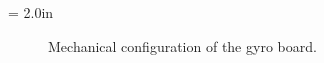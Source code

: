 

\epsfysize = 2.0in
\begin{figure}[htp]
\begin{center}
\caption{Mechanical configuration of the gyro board.}
\label{gyro1}
\end{center}
\end{figure}
